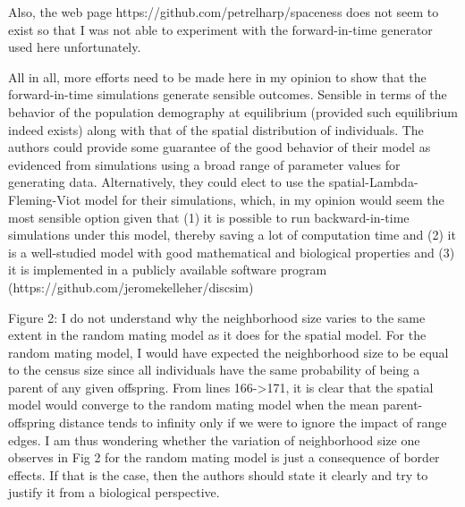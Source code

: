 
\begin{point}{}
    Also, the web page https://github.com/petrelharp/spaceness does not seem to exist so that I was not able to experiment with the forward-in-time generator used here unfortunately.
\end{point}


\begin{point}{}
    All in all, more efforts need to be made here in my opinion to show that the forward-in-time simulations generate sensible outcomes. Sensible in terms of the behavior of the population demography at equilibrium (provided such equilibrium indeed exists) along with that of the spatial distribution of individuals. The authors could provide some guarantee of the good behavior of their model as evidenced from simulations using a broad range of parameter values for generating data. Alternatively, they could elect to use the spatial-Lambda-Fleming-Viot model for their simulations, which, in my opinion would seem the most sensible option given that (1) it is possible to run backward-in-time simulations under this model, thereby saving a lot of computation time and (2) it is a well-studied model with good mathematical and biological properties and (3) it is implemented in a publicly available software program (https://github.com/jeromekelleher/discsim)
\end{point}


\begin{point}{}
    Figure 2: I do not understand why the neighborhood size varies to the same extent in the random mating model as it does for the spatial model. For the random mating model, I would have expected the neighborhood size to be equal to the census size since all individuals have the same probability of being a parent of any given offspring. From lines 166->171, it is clear that the spatial model would converge to the random mating model when the mean parent-offspring distance tends to infinity only if we were to ignore the impact of range edges. I am thus wondering whether the variation of neighborhood size one observes in Fig 2 for the random mating model is just a consequence of border effects. If that is the case, then the authors should state it clearly and try to justify it from a biological perspective.
\end{point}

